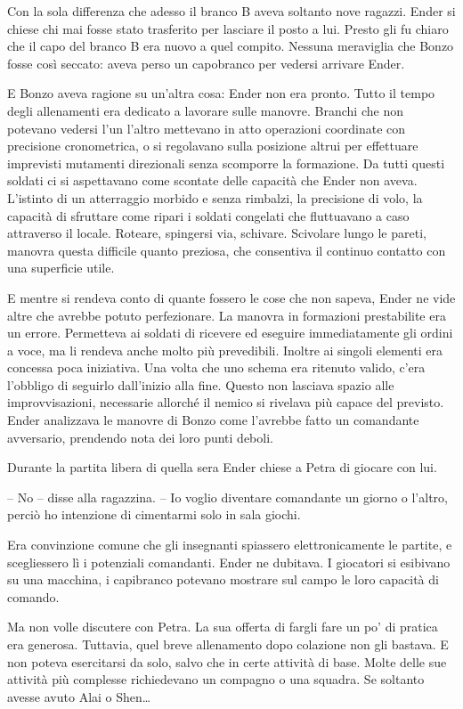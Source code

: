 {Con la sola differenza che adesso il branco B aveva soltanto nove
	ragazzi. Ender si chiese chi mai fosse stato trasferito per lasciare il
	posto a lui. Presto gli fu chiaro che il capo del branco B era nuovo a
	quel compito. Nessuna meraviglia che Bonzo fosse così seccato: aveva
	perso un capobranco per vedersi arrivare Ender.}

{E Bonzo aveva ragione su un'altra cosa: Ender non era pronto. Tutto il
	tempo degli allenamenti era dedicato a lavorare sulle manovre. Branchi
	che non potevano vedersi l'un l'altro mettevano in atto operazioni
	coordinate con precisione cronometrica, o si regolavano sulla posizione
	altrui per effettuare imprevisti mutamenti direzionali senza scomporre
	la formazione. Da tutti questi soldati ci si aspettavano come scontate
	delle capacità che Ender non aveva. L'istinto di un atterraggio morbido
	e senza rimbalzi, la precisione di volo, la capacità di sfruttare come
	ripari i soldati congelati che fluttuavano a caso attraverso il locale.
	Roteare, spingersi via, schivare. Scivolare lungo le pareti, manovra
	questa difficile quanto preziosa, che consentiva il continuo contatto
	con una superficie utile.}

{E mentre si rendeva conto di quante fossero le cose che non sapeva,
	Ender ne vide altre che avrebbe potuto perfezionare. La manovra in
	formazioni prestabilite era un errore. Permetteva ai soldati di ricevere
	ed eseguire immediatamente gli ordini a voce, ma li rendeva anche molto
	più prevedibili. Inoltre ai singoli elementi era concessa poca
	iniziativa. Una volta che uno schema era ritenuto valido, c'era
	l'obbligo di seguirlo dall'inizio alla fine. Questo non lasciava spazio
	alle improvvisazioni, necessarie allorché il nemico si rivelava più
	capace del previsto. Ender analizzava le manovre di Bonzo come l'avrebbe
	fatto un comandante avversario, prendendo nota dei loro punti deboli.}

{Durante la partita libera di quella sera Ender chiese a Petra di
	giocare con lui.}

{-- No -- disse alla ragazzina. -- Io voglio diventare comandante un
	giorno o l'altro, perciò ho intenzione di cimentarmi solo in sala
	giochi.}

{Era convinzione comune che gli insegnanti spiassero elettronicamente le
	partite, e scegliessero lì i potenziali comandanti. Ender ne dubitava. I
	giocatori si esibivano su una macchina, i capibranco potevano mostrare
	sul campo le loro capacità di comando.}

{Ma non volle discutere con Petra. La sua offerta di fargli fare un po'
	di pratica era generosa. Tuttavia, quel breve allenamento dopo colazione
	non gli bastava. E non poteva esercitarsi da solo, salvo che in certe
	attività di base. Molte delle sue attività più complesse richiedevano un
	compagno o una squadra. Se soltanto avesse avuto Alai o Shen\ldots{}}

